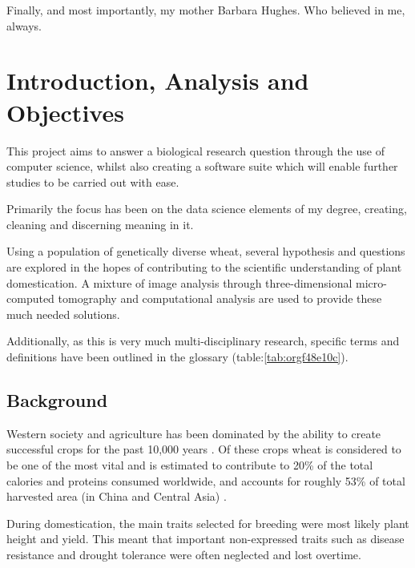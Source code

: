 \documentclass[11pt]{report}
\begin{document}
\vspace{1cm}

Finally, and most importantly, my mother Barbara Hughes. Who believed in me, always.



  \clearpage
  \tableofcontents
  \clearpage
  \listoftables
  \clearpage
  \listoffigures
  \clearpage
  \listofmyequations
  \clearpage
  \listoflistings
  \clearpage

\chapter{Introduction, Analysis and Objectives}
\label{sec:orgd5012c2}

This project aims to answer a biological research question through the use of computer science, whilst also creating a software suite which will enable further studies to be carried out with ease.

Primarily the focus has been on the data science elements of my degree, creating, cleaning and discerning meaning in it.

Using a population of genetically diverse wheat, several hypothesis and questions are explored in the hopes of contributing to the scientific understanding of plant domestication. A mixture of image analysis through three-dimensional micro-computed tomography and computational analysis are used to provide these much needed solutions.


Additionally, as this is very much multi-disciplinary research, specific terms and definitions have been outlined in the glossary (table:\ref{tab:orgf48e10c}).

\section{Background}
\label{sec:orgf097654}

Western society and agriculture has been dominated by the ability to create successful crops for the past 10,000 years \cite{Ozkan2002}. Of these crops wheat is considered to be one of the most vital and is estimated to contribute to 20\% of the total calories and proteins consumed worldwide, and accounts for roughly 53\% of total harvested area (in China and Central Asia) \cite{Shiferaw2013}.

During domestication, the main traits selected for breeding were most likely plant height and yield. This meant that important non-expressed traits such as disease resistance and drought tolerance were often neglected and lost overtime.
\end{document}
